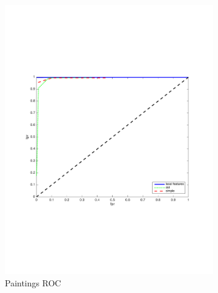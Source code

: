 \documentclass[english,12pt,a4paper,pdftex,elec,utf8, table]{aaltothesis}
\begin{document}
\clearpage
\begin{figure}[htb]
  \begin{center}
  \begin{subfigure}[b]{0.49\textwidth}
    \includegraphics[width=\textwidth]{figures/83scaleROC.pdf}
    \caption{Paintings ROC}
    \label{83roc}
  \end{subfigure}
  \begin{subfigure}[b]{0.49\textwidth}

\end{subfigure}
\end{center}
\end{figure}
\end{document}
